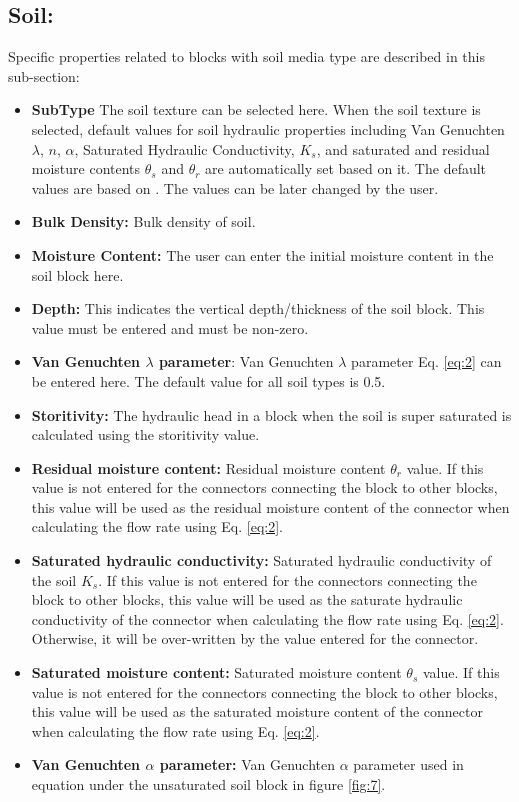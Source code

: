 \subsection{Soil: }
Specific properties related to blocks with soil media type are described in this sub-section: 
\begin{itemize}
\item \textbf{SubType} The soil texture can be selected here. When the soil texture is selected, default values for soil hydraulic properties including Van Genuchten $\lambda$, $n$, $\alpha$, Saturated Hydraulic Conductivity, $K_s$, and saturated and residual moisture contents $\theta_s$ and $\theta_r$ are automatically set based on it. The default values are based on \citep{carsel1988}. The values can be later changed by the user. 
\item \textbf{Bulk Density: } Bulk density of soil. 
\item \textbf{Moisture Content: } The user can enter the initial moisture content in the soil block here. 
\item \textbf{Depth: } This indicates the vertical depth/thickness of the soil block. This value must be entered and must be non-zero. 
\item \textbf{Van Genuchten $\lambda$ parameter}: Van Genuchten $\lambda$ parameter Eq. \ref{eq:2} can be entered here. The default value for all soil types is 0.5.
\item \textbf{Storitivity: } The hydraulic head in a block when the soil is super saturated is calculated using the storitivity value. 
\item \textbf{Residual moisture content: } Residual moisture content $\theta_r$ value. If this value is not entered for the connectors connecting the block to other blocks, this value will be used as the residual moisture content of the connector when calculating the flow rate using Eq. \ref{eq:2}. 
\item \textbf{Saturated hydraulic conductivity: } Saturated hydraulic conductivity of the soil $K_s$. If this value is not entered for the connectors connecting the block to other blocks, this value will be used as the saturate hydraulic conductivity of the connector when calculating the flow rate using Eq. \ref{eq:2}. Otherwise, it will be over-written by the value entered for the connector. 
\item \textbf{Saturated moisture content: } Saturated moisture content $\theta_s$ value. If this value is not entered for the connectors connecting the block to other blocks, this value will be used as the saturated moisture content of the connector when calculating the flow rate using Eq. \ref{eq:2}. 
\item \textbf{Van Genuchten $\alpha$ parameter: } Van Genuchten $\alpha$ parameter used in equation under the unsaturated soil block in figure \ref{fig:7}. 
\end{itemize}
